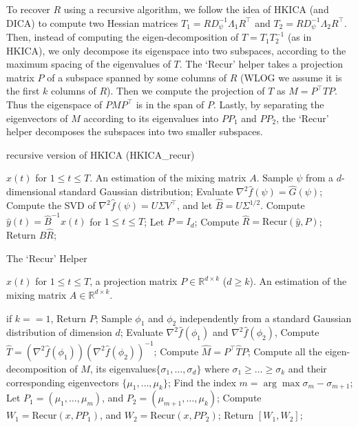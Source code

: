 \documentclass[jmlr]{article}
\newcommand{\real}{\mathbb{R}}
\newcommand{\R}{\real}
\theoremstyle{definition}
\begin{document}
To recover $R$ using a recursive algorithm, we follow the idea of HKICA (and DICA) to compute two Hessian matrices $T_1 = RD_{\psi}^{-1}\Lambda_1R^{\top}$ and $T_2 = RD_{\psi}^{-1}\Lambda_2R^{\top}$. 
Then, instead of computing the eigen-decomposition of $T = T_1 T_2^{-1}$ (as in HKICA), we only decompose its eigenspace into two subspaces, according to the maximum spacing of the eigenvalues of $T$. 
The `Recur' helper takes a projection matrix $P$ of a subspace spanned
by some columns of $R$ (WLOG we assume it is the first $k$ columns of $R$). Then we compute the projection of $T$ as $M = P^{\top}TP$. Thus the eigenspace of $PMP^{\top}$ is in the span of $P$. 
Lastly, by separating the eigenvectors of $M$ according to its eigenvalues into $PP_1$ and $PP_2$, the `Recur' helper decomposes the subspaces into two smaller subspaces.  

\begin{algorithm} 
\caption{recursive version of HKICA (HKICA\_recur)}
\label{alg:HKICA_recur}
\begin{algorithmic}[1]
\INPUT $x(t)$ for $1\le t \le T$. 
\OUTPUT An estimation of the mixing matrix $A$. 
\STATE Sample $\psi$ from a $d$-dimensional standard Gaussian distribution;
\STATE Evaluate $\nabla^2\hat{f}(\psi) = \hat{G}(\psi)$; \\
\STATE Compute the SVD of $\nabla^2\hat{f}(\psi) = U \Sigma V^{\top}$, and let $\hat{B} =  U \Sigma^{1/2}$.
\STATE Compute $\hat{y}(t) = \hat{B}^{-1}x(t)$ for $1\le t \le T$;
\STATE Let $P = I_d$;
\STATE Compute $\hat{R} = \text{Recur}(\hat{y}, P)$;
\STATE Return $\hat{B}\hat{R}$;
\end{algorithmic}
\end{algorithm}
\begin{algorithm} 
\caption{The `Recur' Helper}
\label{alg:recur}
\begin{algorithmic}[1]
\INPUT $x(t)$ for $1\le t \le T$, a projection matrix $P\in \R^{d\times k}$ ($d\ge k$). 
\OUTPUT An estimation of the mixing matrix $A\in \R^{d\times k}$. 

\STATE if $k==1$, Return $P$;
\STATE Sample $\phi_1$ and $\phi_2$ independently from a standard Gaussian distribution of dimension $d$;
\STATE Evaluate $\nabla^2\hat{f}(\phi_1)$ and $\nabla^2\hat{f}(\phi_2)$, 
\STATE Compute $\hat{T} = (\nabla^2 \hat{f}(\phi_1))(\nabla^2\hat{f}(\phi_2))^{-1}$;
\STATE Compute $\hat{M} = P^{\top} \hat{T} P$;
\STATE Compute all the eigen-decomposition of $\hat{M}$, its eigenvalues$\{\sigma_1,\ldots,\sigma_d\}$ where $\sigma_1\ge\ldots\ge \sigma_k$ and their corresponding eigenvectors $\{\mu_1,\ldots, \mu_k\}$;
\STATE Find the index $m = \arg\max \sigma_m - \sigma_{m+1}$; 
\STATE Let $P_1 = (\mu_1,\ldots,\mu_m)$, and $P_2 = (\mu_{m+1},\ldots,\mu_k)$;
\STATE Compute $W_1 = \text{Recur} (x, PP_1)$, and  $W_2 = \text{Recur} (x, PP_2)$;
\STATE Return $[W_1,W_2]$;
\end{algorithmic}
\end{algorithm}
\end{document}
